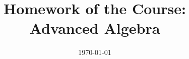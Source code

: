 \documentclass[12pt]{article}
\title{
    \vspace{-2cm}
    \textbf{Homework of the Course: \\ Advanced Algebra}
}
\author{}
\date{\today}
\begin{document}
\maketitle
\tableofcontents
\newpage

\renewcommand{\theequation}{1.\arabic{equation}}









\renewcommand{\theequation}{2.\arabic{equation}}



\end{document}
